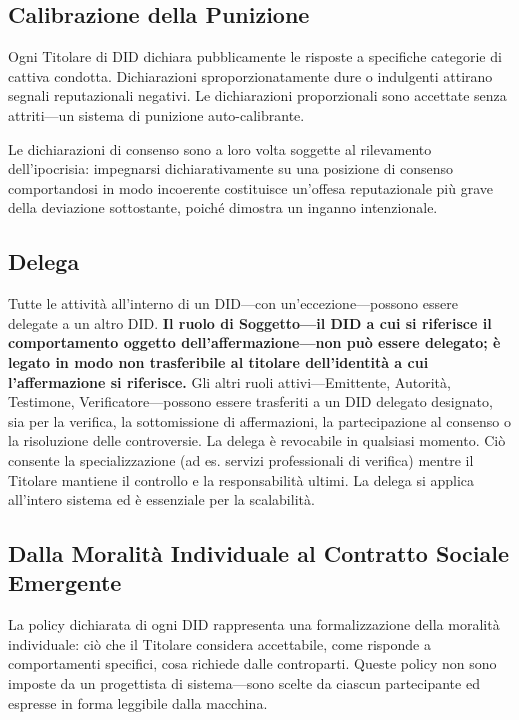 \documentclass[11pt,a4paper,twocolumn]{article}
\begin{document}
\subsection{Calibrazione della Punizione}

Ogni Titolare di DID dichiara pubblicamente le risposte a specifiche categorie di cattiva condotta. Dichiarazioni sproporzionatamente dure o indulgenti attirano segnali reputazionali negativi. Le dichiarazioni proporzionali sono accettate senza attriti---un sistema di punizione auto-calibrante.

Le dichiarazioni di consenso sono a loro volta soggette al rilevamento dell'ipocrisia: impegnarsi dichiarativamente su una posizione di consenso comportandosi in modo incoerente costituisce un'offesa reputazionale più grave della deviazione sottostante, poiché dimostra un inganno intenzionale.

\subsection{Delega}

Tutte le attività all'interno di un DID---con un'eccezione---possono essere delegate a un altro DID. \textbf{Il ruolo di Soggetto---il DID a cui si riferisce il comportamento oggetto dell'affermazione---non può essere delegato; è legato in modo non trasferibile al titolare dell'identità a cui l'affermazione si riferisce.} Gli altri ruoli attivi---Emittente, Autorità, Testimone, Verificatore---possono essere trasferiti a un DID delegato designato, sia per la verifica, la sottomissione di affermazioni, la partecipazione al consenso o la risoluzione delle controversie. La delega è revocabile in qualsiasi momento. Ciò consente la specializzazione (ad es. servizi professionali di verifica) mentre il Titolare mantiene il controllo e la responsabilità ultimi. La delega si applica all'intero sistema ed è essenziale per la scalabilità.

\subsection{Dalla Moralità Individuale al Contratto Sociale Emergente}

La policy dichiarata di ogni DID rappresenta una formalizzazione della moralità individuale: ciò che il Titolare considera accettabile, come risponde a comportamenti specifici, cosa richiede dalle controparti. Queste policy non sono imposte da un progettista di sistema---sono scelte da ciascun partecipante ed espresse in forma leggibile dalla macchina.
\end{document}
